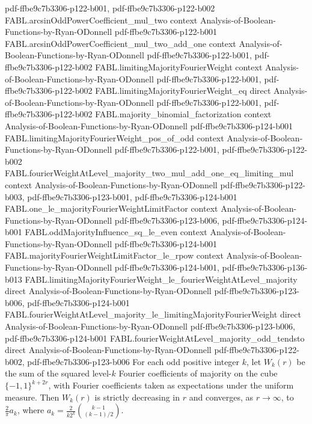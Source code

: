 \begin{theorem}
  {pdf-ffbe9c7b3306-p122-b001,
    pdf-ffbe9c7b3306-p122-b002}
\proofstep
  {FABL.arcsinOddPowerCoefficient_mul_two}
  {context}
  {Analysis-of-Boolean-Functions-by-Ryan-ODonnell}
  {pdf-ffbe9c7b3306-p122-b001}
\proofstep
  {FABL.arcsinOddPowerCoefficient_mul_two_add_one}
  {context}
  {Analysis-of-Boolean-Functions-by-Ryan-ODonnell}
  {pdf-ffbe9c7b3306-p122-b001,
    pdf-ffbe9c7b3306-p122-b002}
\proofstep
  {FABL.limitingMajorityFourierWeight}
  {context}
  {Analysis-of-Boolean-Functions-by-Ryan-ODonnell}
  {pdf-ffbe9c7b3306-p122-b001,
    pdf-ffbe9c7b3306-p122-b002}
\proofstep
  {FABL.limitingMajorityFourierWeight_eq}
  {direct}
  {Analysis-of-Boolean-Functions-by-Ryan-ODonnell}
  {pdf-ffbe9c7b3306-p122-b001,
    pdf-ffbe9c7b3306-p122-b002}
\proofstep
  {FABL.majority_binomial_factorization}
  {context}
  {Analysis-of-Boolean-Functions-by-Ryan-ODonnell}
  {pdf-ffbe9c7b3306-p124-b001}
\proofstep
  {FABL.limitingMajorityFourierWeight_pos_of_odd}
  {context}
  {Analysis-of-Boolean-Functions-by-Ryan-ODonnell}
  {pdf-ffbe9c7b3306-p122-b001,
    pdf-ffbe9c7b3306-p122-b002}
\proofstep
  {FABL.fourierWeightAtLevel_majority_two_mul_add_one_eq_limiting_mul}
  {context}
  {Analysis-of-Boolean-Functions-by-Ryan-ODonnell}
  {pdf-ffbe9c7b3306-p122-b003,
    pdf-ffbe9c7b3306-p123-b001,
    pdf-ffbe9c7b3306-p124-b001}
\proofstep
  {FABL.one_le_majorityFourierWeightLimitFactor}
  {context}
  {Analysis-of-Boolean-Functions-by-Ryan-ODonnell}
  {pdf-ffbe9c7b3306-p123-b006,
    pdf-ffbe9c7b3306-p124-b001}
\proofstep
  {FABL.oddMajorityInfluence_sq_le_even}
  {context}
  {Analysis-of-Boolean-Functions-by-Ryan-ODonnell}
  {pdf-ffbe9c7b3306-p124-b001}
\proofstep
  {FABL.majorityFourierWeightLimitFactor_le_rpow}
  {context}
  {Analysis-of-Boolean-Functions-by-Ryan-ODonnell}
  {pdf-ffbe9c7b3306-p124-b001,
    pdf-ffbe9c7b3306-p136-b013}
\proofstep
  {FABL.limitingMajorityFourierWeight_le_fourierWeightAtLevel_majority}
  {direct}
  {Analysis-of-Boolean-Functions-by-Ryan-ODonnell}
  {pdf-ffbe9c7b3306-p123-b006,
    pdf-ffbe9c7b3306-p124-b001}
\proofstep
  {FABL.fourierWeightAtLevel_majority_le_limitingMajorityFourierWeight}
  {direct}
  {Analysis-of-Boolean-Functions-by-Ryan-ODonnell}
  {pdf-ffbe9c7b3306-p123-b006,
    pdf-ffbe9c7b3306-p124-b001}
\proofstep
  {FABL.fourierWeightAtLevel_majority_odd_tendsto}
  {direct}
  {Analysis-of-Boolean-Functions-by-Ryan-ODonnell}
  {pdf-ffbe9c7b3306-p122-b002,
    pdf-ffbe9c7b3306-p123-b006}
For each odd positive integer $k$, let $W_k(r)$ be the sum of the squared level-$k$
Fourier coefficients of majority on the cube $\{-1,1\}^{k+2r}$, with Fourier
coefficients taken as expectations under the uniform measure. Then $W_k(r)$ is strictly
decreasing in $r$ and converges, as $r\to\infty$, to $\frac{2}{\pi}a_k$, where
$a_k=\frac{2}{k2^k}\binom{k-1}{(k-1)/2}$.
\end{theorem}
